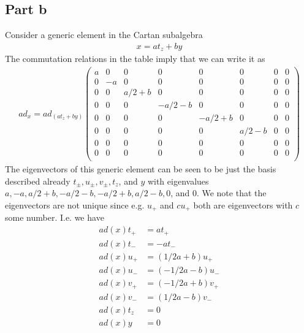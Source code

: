 \documentclass[a4paper,12pt]{article}
\begin{document}
\subsection*{Part b}
Consider a generic element in the Cartan subalgebra
\begin{equation}
	\begin{aligned}
		x=at_z+by
	\end{aligned}
\end{equation}
The commutation relations in the table imply that we can write it as
\begin{equation}
	\begin{aligned}
	ad_x=ad_{(at_z+by)}
	\left(
	\begin{array}{cccccccc}
		a & 0 & 0 & 0 & 0 & 0 & 0 & 0 \\
		0 & -a & 0 & 0 & 0 & 0 & 0 & 0 \\
		0 & 0 & a/2+b & 0 & 0 & 0 & 0 & 0 \\
		0 & 0 & 0 & -a/2-b  & 0& 0 & 0 & 0 \\
		0 & 0 & 0 & 0 & -a/2+b & 0 & 0 & 0 \\
		0 & 0 & 0 & 0 & 0 & a/2-b & 0 & 0 \\
		0 & 0 & 0 & 0 & 0 & 0 & 0 & 0 \\
		0 & 0 & 0 & 0 & 0 & 0 & 0 & 0 \\
	\end{array}
	\right)
	\end{aligned}
\end{equation}
The eigenvectors of this generic element can be seen to be just the basis described already 
$t_\pm, u_\pm, v_\pm, t_z $, and $y$ with eigenvalues $a, -a, a/2+b, -a/2-b, -a/2+b, a/2-b,0$, and $0$. We note that the eigenvectors are not unique since e.g. $u_+$ and $cu_+$ both are eigenvectors with $c$ some number. I.e. we have
\begin{equation} \label{eq:adj}
	\begin{aligned}
		ad(x)t_+&=at_+\\
		ad(x)t_-&=-at_- \\
		ad(x)u_+&=(1/2a+b)u_+\\
		ad(x)u_-&=(-1/2a-b)u_-\\
		ad(x)v_+&=(-1/2a+b)v_+\\
		ad(x)v_-&=(1/2a-b)v_-\\
		ad(x)t_z&=0\\
		ad(x)y&=0\\
	\end{aligned}
\end{equation}
\end{document}

